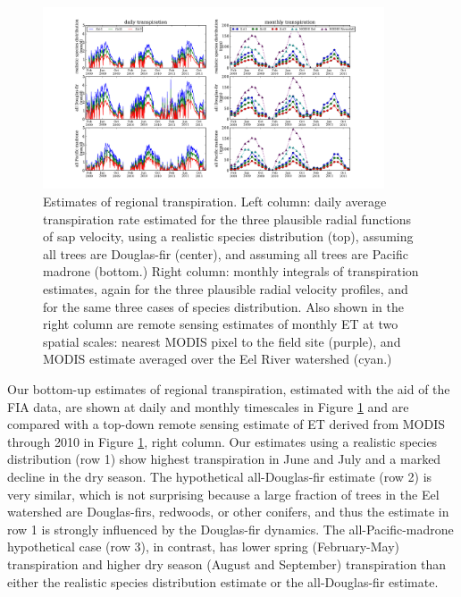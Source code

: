 \begin{figure}[here]
\includegraphics[width=0.9\textwidth]{ch1-sapflow/figures/Figure10.pdf}
\caption{Estimates of regional transpiration.  Left column: daily average transpiration rate estimated for the three plausible radial functions of sap velocity, using a realistic species distribution (top), assuming all trees are Douglas-fir (center), and assuming all trees are Pacific madrone (bottom.)  Right column: monthly integrals of transpiration estimates, again for the three plausible radial velocity profiles, and for the same three cases of species distribution.  Also shown in the right column are remote sensing estimates of monthly ET at two spatial scales: nearest MODIS pixel to the field site (purple), and MODIS estimate averaged over the Eel River watershed (cyan.)}
\label{fig:sapflow_regional}
\end{figure}

Our bottom-up estimates of regional transpiration, estimated with the aid of the FIA data, are shown at daily and monthly timescales in Figure \ref{fig:sapflow_regional} and are compared with a top-down remote sensing estimate of ET derived from MODIS through 2010 in Figure \ref{fig:sapflow_regional}, right column.  Our estimates using a realistic species distribution (row 1) show highest transpiration in June and July and a marked decline in the dry season.  The hypothetical all-Douglas-fir estimate (row 2) is very similar, which is not surprising because a large fraction of trees in the Eel watershed are Douglas-firs, redwoods, or other conifers, and thus the estimate in row 1 is strongly influenced by the Douglas-fir dynamics.  The all-Pacific-madrone hypothetical case (row 3), in contrast, has lower spring (February-May) transpiration and higher dry season (August and September) transpiration than either the realistic species distribution estimate or the all-Douglas-fir estimate.

